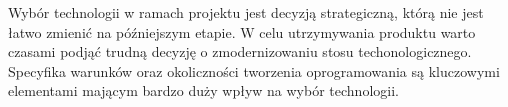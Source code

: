 Wybór technologii w ramach projektu jest decyzją strategiczną, którą nie jest łatwo zmienić na późniejszym etapie.
W celu utrzymywania produktu warto czasami podjąć trudną decyzję o zmodernizowaniu stosu techonologicznego.
Specyfika warunków oraz okoliczności tworzenia oprogramowania są kluczowymi elementami mającym bardzo duży wpływ na wybór technologii.